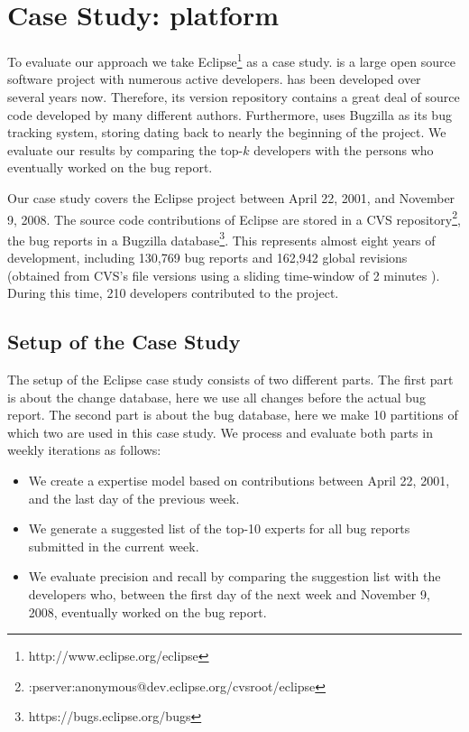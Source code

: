 \documentclass[10pt]{book}
\begin{document}
\section{Case Study: \EC platform}\label{sec:casestudy}

To evaluate our approach we take Eclipse\footnote{http://www.eclipse.org/eclipse} as a case study. \EC is a large open source software project with numerous active developers.
\EC has been developed over several years now. Therefore, its version repository contains a great deal of source code developed by many different authors.
Furthermore, \EC uses Bugzilla as its bug tracking system, storing \BRs dating back to nearly the beginning of the project.
We evaluate our results by comparing the top-$k$ developers with the persons who eventually worked on the bug report.

Our case study covers the Eclipse project between April 22, 2001, and November 9, 2008. The source code contributions of Eclipse are stored in a CVS repository\footnote{:pserver:anonymous@dev.eclipse.org/cvsroot/eclipse}, the bug reports in a Bugzilla database\footnote{https://bugs.eclipse.org/bugs}. This represents almost eight years of development, including 130,769 bug reports and 162,942 global revisions (obtained from CVS's file versions using a sliding time-window of 2 minutes \cite{Zimm04a}). During this time, 210 developers contributed to the project.

\subsection{Setup of the Case Study}

The setup of the Eclipse case study consists of two different parts. The first part is about the change database, here we use all changes before the actual bug report. The second part is about the bug database, here we make 10 partitions of which two are used in this case study. We process and evaluate  both parts in weekly iterations as follows:
\begin{itemize}
\item We create a \TOOL expertise model based on contributions between April 22, 2001, and the last day of the previous week.
\item We generate a suggested list of the top-10 experts for all bug reports submitted in the current week.
\item We evaluate precision and recall by comparing the suggestion list with the developers who, between the first day of the next week and November 9, 2008, eventually worked on the bug report.
\end{itemize}
\end{document}
